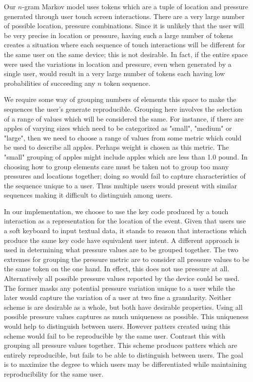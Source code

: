 Our $n$-gram Markov model uses tokens
which are a tuple of location and pressure
generated through user touch screen interactions. 
There are a very large number of possible
location, pressure combinations.
Since it is unlikely that the user will be
very precise in location or pressure,
having such a large number of tokens
creates a situation where each sequence of 
touch interactions will be different
for the same user on the same device;
this is not desirable.
In fact, if the entire space were used 
the variations in location and pressure,
even when generated by a single user,
would result in a very large number of tokens
each having low probabilities of succeeding any
$n$ token sequence.

We require some way of grouping numbers of elements this space
to make the sequences the user's generate reproducible.
%
Grouping here involves the selection of
a range of values which will be considered the same.
%
For instance, 
if there are apples of varying sizes
which need to be categorized as "small", "medium" or "large",
then we need to choose a range of values 
from some metric which could be used to describe all apples.
Perhaps weight is chosen as this metric.
The "small" grouping of apples might include
apples which are less than 1.0 pound.
%
In choosing how to group elements
care must be taken not to group too many 
pressures and locations together;
doing so would fail to capture characteristics
of the sequence unique to a user.
Thus multiple users would present with similar sequences
making it difficult to distinguish among users.

In our implementation,
we choose to use the key code produced by 
a touch interaction as a representation 
for the location of the event.
Given that users use a soft keyboard to input
textual data, it stands to reason that
interactions which produce the same key code have equivalent user intent.
%
A different approach is used in determining
what pressure values are to be grouped together.
The two extremes for grouping the pressure metric 
are to consider all pressure values to be the same token on the one hand.
In effect, this does not use pressure at all.
Alternatively all possible pressure values reported
by the device could be used.
The former masks any potential pressure variation unique to a user while
the later would capture the variation of a user at two fine a granularity.
Neither scheme is are desirable as a whole, but both have desirable properties.
%
Using all possible pressure values captures
as much uniqueness as possible.
This uniqueness would help to distinguish between users.
However patters created using this scheme would 
fail to be reproducible by the same user.
Contrast this with grouping all pressure values together. 
This scheme produces patters which are entirely reproducible, but
fails to be able to distinguish between users.
%
The goal is to maximize the degree to which users
may be differentiated while maintaining
reproducibility for the same user.

